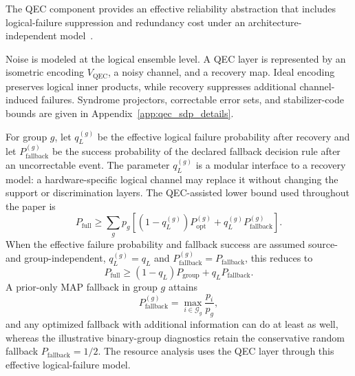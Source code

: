 \documentclass[
 reprint,
 amsmath,amssymb,
 aps,
 pra,
 floatfix,
]{revtex4-2}
\begin{document}
The QEC component provides an effective reliability abstraction that includes logical-failure suppression and redundancy cost under an architecture-independent model~\cite{nielsen2010quantum,terhal2015quantum}.

Noise is modeled at the logical ensemble level. A QEC layer is represented by an isometric encoding $V_{\mathrm{QEC}}$, a noisy channel, and a recovery map. Ideal encoding preserves logical inner products, while recovery suppresses additional channel-induced failures. Syndrome projectors, correctable error sets, and stabilizer-code bounds are given in Appendix~\ref{app:qec_sdp_details}.

For group $g$, let $q_L^{(g)}$ be the effective logical failure probability after recovery and let $P_{\mathrm{fallback}}^{(g)}$ be the success probability of the declared fallback decision rule after an uncorrectable event. The parameter $q_L^{(g)}$ is a modular interface to a recovery model: a hardware-specific logical channel may replace it without changing the support or discrimination layers. The QEC-assisted lower bound used throughout the paper is
\begin{equation}
    P_{\mathrm{full}}
    \ge
    \sum_g p_g\left[(1-q_L^{(g)})P_{\mathrm{opt}}^{(g)}+q_L^{(g)}P_{\mathrm{fallback}}^{(g)}\right].
    \label{eq:full_bound_main}
\end{equation}
When the effective failure probability and fallback success are assumed source- and group-independent, $q_L^{(g)}=q_L$ and $P_{\mathrm{fallback}}^{(g)}=P_{\mathrm{fallback}}$, this reduces to
\begin{equation}
    P_{\mathrm{full}}\ge (1-q_L)P_{\mathrm{group}}+q_LP_{\mathrm{fallback}}.
    \label{eq:full_bound_simple_main}
\end{equation}
A prior-only MAP fallback in group \(g\) attains
\begin{equation}
    P_{\mathrm{fallback}}^{(g)}
    =
    \max_{i\in\mathcal G_g}\frac{p_i}{p_g},
    \label{eq:map_aware_fallback_floor}
\end{equation}
and any optimized fallback with additional information can do at least as well, whereas the illustrative binary-group diagnostics retain the conservative random fallback \(P_{\mathrm{fallback}}=1/2\).
The resource analysis uses the QEC layer through this effective logical-failure model.
\end{document}
